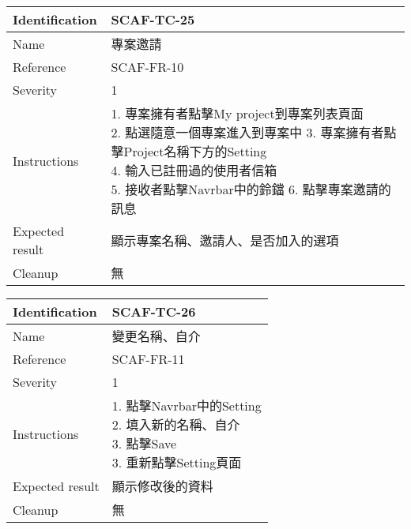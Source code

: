 \documentclass{report}
\begin{document}
\begin{tabularx}{0.9\textwidth}{
  |p{}%
  |p{}|%
  }
  \hline
  \centering Identification &  SCAF-TC-25 \\
  \hline
  \centering Name & 專案邀請 \\
  \hline
  \centering Reference & SCAF-FR-10 \\
  \hline
  \centering Severity & 1 \\
  \hline
  \centering Instructions & 
  \makecell{
    1. 專案擁有者點擊My project到專案列表頁面 \\
    2. 點選隨意一個專案進入到專案中
    3. 專案擁有者點擊Project名稱下方的Setting \\
    4. 輸入已註冊過的使用者信箱 \\
    5. 接收者點擊Navrbar中的鈴鐺
    6. 點擊專案邀請的訊息
  }\\
  \hline
  \centering Expected result & 顯示專案名稱、邀請人、是否加入的選項 \\
  \hline
  \centering Cleanup & 無 \\
  \hline
\end{tabularx}
\newline\newline

\begin{tabularx}{0.9\textwidth}{
  |p{}%
  |p{}|%
  }
  \hline
  \centering Identification &  SCAF-TC-26 \\
  \hline
  \centering Name & 變更名稱、自介 \\
  \hline
  \centering Reference & SCAF-FR-11 \\
  \hline
  \centering Severity & 1 \\
  \hline
  \centering Instructions & 
  \makecell{
    1. 點擊Navrbar中的Setting \\
    2. 填入新的名稱、自介 \\
    3. 點擊Save \\
    3. 重新點擊Setting頁面
  }\\
  \hline
  \centering Expected result & 顯示修改後的資料 \\
  \hline
  \centering Cleanup & 無 \\
  \hline
\end{tabularx}
\newline\newline
\end{document}

